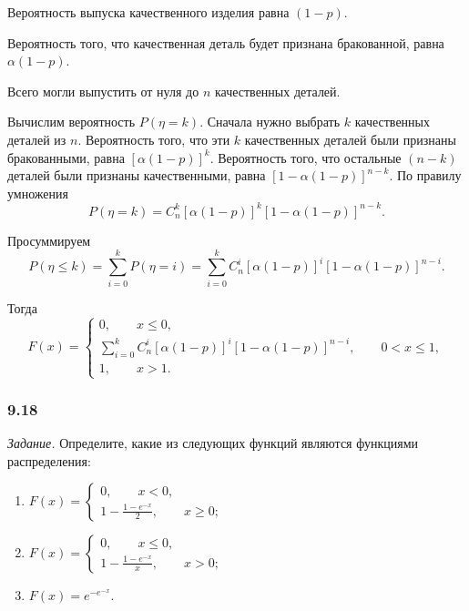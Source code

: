 \begin{enumerate}[label=\alph*)]
Вероятность выпуска качественного изделия равна $ \left( 1 - p \right) $.

Вероятность того, что качественная деталь будет признана бракованной, равна $ \alpha \left( 1 - p \right) $.

Всего могли выпустить от нуля до $n$ качественных деталей.

Вычислим вероятность $P \left( \eta = k \right) $.
Сначала нужно выбрать $k$ качественных деталей из $n$.
Вероятность того, что эти $k$ качественных деталей были признаны бракованными, равна $ \left[ \alpha \left( 1 - p \right) \right]^k$.
Вероятность того, что остальные $ \left( n - k \right) $ деталей были признаны качественными,
равна $ \left[ 1 - \alpha \left( 1 - p \right) \right]^{n-k}$.
По правилу умножения
$$P \left( \eta = k \right) =
C_n^k \left[ \alpha \left( 1 - p \right) \right]^k \left[ 1 - \alpha \left( 1 - p \right) \right]^{n-k}.$$

Просуммируем
$$P \left( \eta \leq k \right) =
\sum \limits_{i=0}^k P \left( \eta = i \right) =
\sum \limits_{i=0}^k C_n^i \left[ \alpha \left( 1-p \right) \right]^i \left[ 1 - \alpha \left( 1-p \right) \right]^{n-i}.$$

Тогда
$$F \left( x \right) =
\begin{cases}
0, \qquad x \leq 0, \\
\sum \limits_{i=0}^k C_n^i \left[ \alpha \left( 1-p \right) \right]^i \left[ 1 - \alpha \left( 1-p \right) \right]^{n-i}, \qquad 0 < x \leq 1, \\
1, \qquad x > 1.
\end{cases}$$
\end{enumerate}

\subsubsection*{9.18}

\textit{Задание.} Определите, какие из следующих функций являются функциями распределения:
\begin{enumerate}[label=\alph*)]
\item $F \left( x \right) =
\begin{cases}
0, \qquad x < 0, \\
1 - \frac{1-e^{-x}}{2}, \qquad x \geq 0;
\end{cases}$
\item $F \left( x \right) =
\begin{cases}
0, \qquad x \leq 0, \\
1 - \frac{1-e^{-x}}{x}, \qquad x > 0;
\end{cases}$
\item $F \left( x \right) = e^{-e^{-x}}$.
\end{enumerate}

